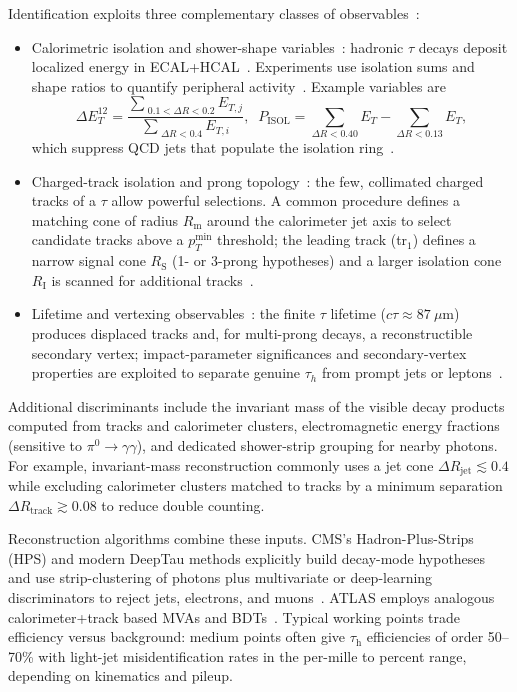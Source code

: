 Identification exploits three complementary classes of observables~\cite{CMS:2018jrd,ATLAS:2014rzk,CMS_DeepTau,CMS:PF2017}:

\begin{itemize}
  \item Calorimetric isolation and shower-shape variables~\cite{CMS:2018jrd,ATLAS:2014rzk}: hadronic $\tau$ decays deposit localized energy in ECAL+HCAL~\cite{CMS:2018jrd}. Experiments use isolation sums and shape ratios to quantify peripheral activity~\cite{CMS:2018jrd,ATLAS:2014rzk}. Example variables are
  \begin{equation}
    \Delta E_T^{12}=\frac{\sum_{\;0.1<\Delta R<0.2} E_{T,j}}{\sum_{\;\Delta R<0.4} E_{T,i}},\;\;
    P_{\mathrm{ISOL}}=\sum_{\Delta R<0.40}E_T - \sum_{\Delta R<0.13}E_T,
  \end{equation}
  which suppress QCD jets that populate the isolation ring~\cite{CMS:2018jrd}.
  \item Charged-track isolation and prong topology~\cite{CMS:2018jrd,CMS:PF2017}: the few, collimated charged tracks of a $\tau$ allow powerful selections. A common procedure defines a matching cone of radius $R_{\mathrm{m}}$ around the calorimeter jet axis to select candidate tracks above a $p_T^{\min}$ threshold; the leading track (tr$_1$) defines a narrow signal cone $R_{\mathrm{S}}$ (1- or 3-prong hypotheses) and a larger isolation cone $R_{\mathrm{I}}$ is scanned for additional tracks~\cite{CMS:2018jrd,CMS:PF2017}.
  \item Lifetime and vertexing observables~\cite{CMS:TRK2014,1674-1137-40-10-100001}: the finite $\tau$ lifetime ($c\tau\approx87\ \mu\mathrm{m}$) produces displaced tracks and, for multi-prong decays, a reconstructible secondary vertex; impact-parameter significances and secondary-vertex properties are exploited to separate genuine $\tau_h$ from prompt jets or leptons~\cite{CMS:TRK2014,1674-1137-40-10-100001}.
\end{itemize}


Additional discriminants include the invariant mass of the visible decay products computed from tracks and calorimeter clusters, electromagnetic energy fractions (sensitive to $\pi^0\to\gamma\gamma$), and dedicated shower-strip grouping for nearby photons. For example, invariant-mass reconstruction commonly uses a jet cone $\Delta R_{\text{jet}}\lesssim0.4$ while excluding calorimeter clusters matched to tracks by a minimum separation $\Delta R_{\text{track}}\gtrsim0.08$ to reduce double counting.

Reconstruction algorithms combine these inputs. CMS's Hadron-Plus-Strips (HPS) and modern DeepTau methods explicitly build decay-mode hypotheses and use strip-clustering of photons plus multivariate or deep-learning discriminators to reject jets, electrons, and muons~\parencite{CMS:2022ydz,CMS_DeepTau}. ATLAS employs analogous calorimeter+track based MVAs and BDTs~\parencite{ATLAS:2022fgo}. Typical working points trade efficiency versus background: medium points often give $\tau_{\mathrm{h}}$ efficiencies of order 50–70\% with light-jet misidentification rates in the per-mille to percent range, depending on kinematics and pileup.

